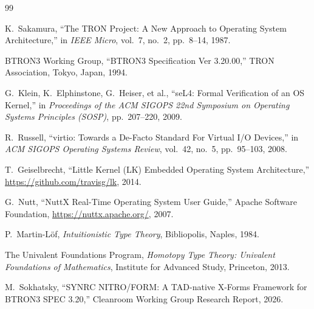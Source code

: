 \documentclass[10pt,journal,compsoc,twocolumn]{article}
\begin{document}
\begin{thebibliography}{99}

K.~Sakamura, ``The TRON Project: A New Approach to Operating System Architecture,'' in \emph{IEEE Micro}, vol.~7, no.~2, pp.~8--14, 1987.

BTRON3 Working Group, ``BTRON3 Specification Ver 3.20.00,'' TRON Association, Tokyo, Japan, 1994.

G.~Klein, K.~Elphinstone, G.~Heiser, et al., ``seL4: Formal Verification of an OS Kernel,'' in \emph{Proceedings of the ACM SIGOPS 22nd Symposium on Operating Systems Principles (SOSP)}, pp.~207--220, 2009.

R.~Russell, ``virtio: Towards a De-Facto Standard For Virtual I/O Devices,'' in \emph{ACM SIGOPS Operating Systems Review}, vol.~42, no.~5, pp.~95--103, 2008.

T.~Geiselbrecht, ``Little Kernel (LK) Embedded Operating System Architecture,'' \url{https://github.com/travisg/lk}, 2014.

G.~Nutt, ``NuttX Real-Time Operating System User Guide,'' Apache Software Foundation, \url{https://nuttx.apache.org/}, 2007.

P.~Martin-L{\"o}f, \emph{Intuitionistic Type Theory}, Bibliopolis, Naples, 1984.

The Univalent Foundations Program, \emph{Homotopy Type Theory: Univalent Foundations of Mathematics}, Institute for Advanced Study, Princeton, 2013.

M.~Sokhatsky, ``SYNRC NITRO/FORM: A TAD-native X-Forms Framework for BTRON3 SPEC 3.20,'' Cleanroom Working Group Research Report, 2026.

\end{thebibliography}
\end{document}
